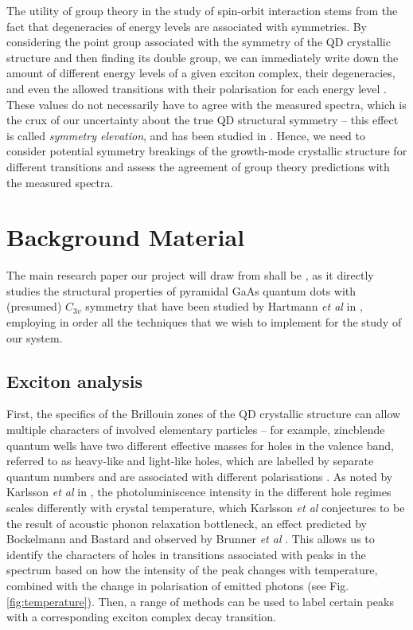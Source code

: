 \documentclass[12pt]{article}
\begin{document}
The utility of group theory in the study of spin-orbit interaction stems from the fact that degeneracies of energy levels are associated with symmetries. By considering the point group associated with the symmetry of the QD crystallic structure and then finding its double group, we can immediately write down the amount of different energy levels of a given exciton complex, their degeneracies, and even the allowed transitions with their polarisation for each energy level \cite[Ch. 19]{dresselhaus}. These values do not necessarily have to agree with the measured spectra, which is the crux of our uncertainty about the true QD structural symmetry -- this effect is called \textit{symmetry elevation}, and has been studied in \cite{karlsson2}. Hence, we need to consider potential symmetry breakings of the growth-mode crystallic structure for different transitions and assess the agreement of group theory predictions with the measured spectra.

\section{Background Material}

The main research paper our project will draw from shall be \cite{karlsson}, as it directly studies the structural properties of pyramidal GaAs quantum dots with (presumed) $C_{3v}$ symmetry that have been studied by Hartmann \textit{et al} in \cite{pyramidal_qds}, employing in order all the techniques that we wish to implement for the study of our system.

\subsection{Exciton analysis}
First, the specifics of the Brillouin zones of the QD crystallic structure can allow multiple characters of involved elementary particles -- for example, zincblende quantum wells have two different effective masses for holes in the valence band, referred to as heavy-like and light-like holes, which are labelled by separate quantum numbers and are associated with different polarisations \cite{karlsson2}. As noted by Karlsson \textit{et al} in \cite{karlsson}, the photoluminiscence intensity in the different hole regimes scales differently with crystal temperature, which Karlsson \textit{et al} conjectures to be the result of acoustic phonon relaxation bottleneck, an effect predicted by Bockelmann and Bastard \cite{bastard} and observed by Brunner \textit{et al} \cite{brunner}. This allows us to identify the characters of holes in transitions associated with peaks in the spectrum based on how the intensity of the peak changes with temperature, combined with the change in polarisation of emitted photons (see Fig. \ref{fig:temperature}). Then, a range of methods can be used to label certain peaks with a corresponding exciton complex decay transition.
\end{document}
